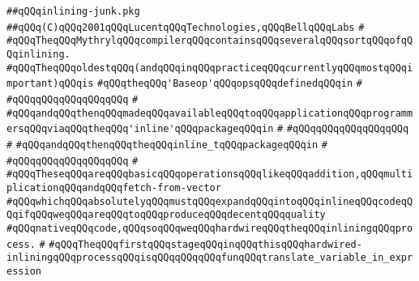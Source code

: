 \label{src/lib/compiler/front/semantic/basics/inlining-junk.pkg}
\verb|##qQQqinlining-junk.pkg|\newline
\verb|##qQQq(C)qQQq2001qQQqLucentqQQqTechnologies,qQQqBellqQQqLabs|\newline
\verb|#|\newline
\verb|#qQQqTheqQQqMythrylqQQqcompilerqQQqcontainsqQQqseveralqQQqsortqQQqofqQQqinlining.|\newline
\verb|#qQQqTheqQQqoldestqQQq(andqQQqinqQQqpracticeqQQqcurrentlyqQQqmostqQQqimportant)qQQqis|\newline
\verb|#qQQqtheqQQq'Baseop'qQQqopsqQQqdefinedqQQqin|\newline
\verb|#|\newline
\verb|#qQQqqQQqqQQqqQQqqQQq|\newline
\verb|#|\newline
\verb|#qQQqandqQQqthenqQQqmadeqQQqavailableqQQqtoqQQqapplicationqQQqprogrammersqQQqviaqQQqtheqQQq'inline'qQQqpackageqQQqin|\newline
\verb|#|\newline
\verb|#qQQqqQQqqQQqqQQqqQQq|\newline
\verb|#|\newline
\verb|#qQQqandqQQqthenqQQqtheqQQqinline_tqQQqpackageqQQqin|\newline
\verb|#|\newline
\verb|#qQQqqQQqqQQqqQQqqQQq|\newline
\verb|#|\newline
\verb|#qQQqTheseqQQqareqQQqbasicqQQqoperationsqQQqlikeqQQqaddition,qQQqmultiplicationqQQqandqQQqfetch-from-vector|\newline
\verb|#qQQqwhichqQQqabsolutelyqQQqmustqQQqexpandqQQqintoqQQqinlineqQQqcodeqQQqifqQQqweqQQqareqQQqtoqQQqproduceqQQqdecentqQQqquality|\newline
\verb|#qQQqnativeqQQqcode,qQQqsoqQQqweqQQqhardwireqQQqtheqQQqinliningqQQqprocess.|\newline
\verb|#|\newline
\verb|#qQQqTheqQQqfirstqQQqstageqQQqinqQQqthisqQQqhardwired-inliningqQQqprocessqQQqisqQQqqQQqqQQqfunqQQqtranslate_variable_in_expression|\newline
